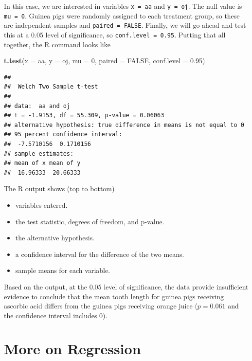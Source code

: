 \documentclass[
]{book}
\newenvironment{Shaded}{\begin{snugshade}}{\end{snugshade}}
\newcommand{\AttributeTok}[1]{\textcolor[rgb]{0.13,0.29,0.53}{#1}}
\newcommand{\ConstantTok}[1]{\textcolor[rgb]{0.56,0.35,0.01}{#1}}
\newcommand{\DecValTok}[1]{\textcolor[rgb]{0.00,0.00,0.81}{#1}}
\newcommand{\FloatTok}[1]{\textcolor[rgb]{0.00,0.00,0.81}{#1}}
\newcommand{\FunctionTok}[1]{\textcolor[rgb]{0.13,0.29,0.53}{\textbf{#1}}}
\newcommand{\NormalTok}[1]{#1}
\providecommand{\tightlist}{%
  \setlength{\itemsep}{0pt}\setlength{\parskip}{0pt}}
\begin{document}
In this case, we are interested in variables \texttt{x\ =\ aa} and \texttt{y\ =\ oj}. The null value is \texttt{mu\ =\ 0}. Guinea pigs were randomly assigned to each treatment group, so these are independent samples and \texttt{paired\ =\ FALSE}. Finally, we will go ahead and test this at a 0.05 level of significance, so \texttt{conf.level\ =\ 0.95}. Putting that all together, the R command looks like

\begin{Shaded}
\begin{Highlighting}[]
\FunctionTok{t.test}\NormalTok{(}\AttributeTok{x =}\NormalTok{ aa, }\AttributeTok{y =}\NormalTok{ oj, }\AttributeTok{mu =} \DecValTok{0}\NormalTok{, }\AttributeTok{paired =} \ConstantTok{FALSE}\NormalTok{, }\AttributeTok{conf.level =} \FloatTok{0.95}\NormalTok{)}
\end{Highlighting}
\end{Shaded}

\begin{verbatim}
## 
##  Welch Two Sample t-test
## 
## data:  aa and oj
## t = -1.9153, df = 55.309, p-value = 0.06063
## alternative hypothesis: true difference in means is not equal to 0
## 95 percent confidence interval:
##  -7.5710156  0.1710156
## sample estimates:
## mean of x mean of y 
##  16.96333  20.66333
\end{verbatim}

The R output shows (top to bottom)

\begin{itemize}
\tightlist
\item
  variables entered.
\item
  the test statistic, degrees of freedom, and p-value.
\item
  the alternative hypothesis.
\item
  a confidence interval for the difference of the two means.
\item
  sample means for each variable.
\end{itemize}

Based on the output, at the 0.05 level of significance, the data provide insufficient evidence to conclude that the mean tooth length for guinea pigs receiving ascorbic acid differs from the guinea pigs receiving orange juice (\(p = 0.061\) and the confidence interval includes 0).

\chapter{More on Regression}\label{more-on-regression}
\end{document}
